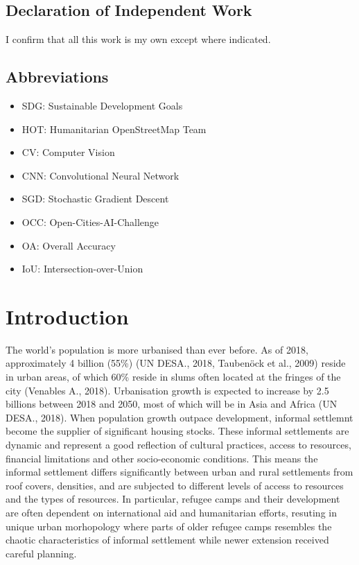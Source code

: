 \documentclass[11pt, a4paper, twoside]{report}
\begin{document}
\newpage
\section{Declaration of Independent Work}

I confirm that all this work is my own except where indicated.
\newpage


\tableofcontents

\newpage

\listoffigures

\newpage

\listoftables
\clearpage

\newpage

\section{Abbreviations}

\begin{itemize}
  \item SDG: Sustainable Development Goals
  \item HOT: Humanitarian OpenStreetMap Team
  \item CV: Computer Vision
  \item CNN: Convolutional Neural Network
  \item SGD: Stochastic Gradient Descent
  \item OCC: Open-Cities-AI-Challenge
  \item OA: Overall Accuracy
  \item IoU: Intersection-over-Union
\end{itemize}

\newpage


\chapter{Introduction}\label{Intro}

The world’s population is more urbanised than ever before. As of 2018, approximately 4 billion (55\%) (UN DESA., 2018, Taubenöck et al., 2009) reside in urban areas, of which 60\% reside in slums often located at the fringes of the city (Venables A., 2018). Urbanisation growth is expected to increase by 2.5 billions between 2018 and 2050, most of which will be in Asia and Africa (UN DESA., 2018). When population growth outpace development, informal settlemnt become the supplier of significant housing stocks. These informal settlements are dynamic and represent a good reflection of cultural practices, access to resources, financial limitations and other socio-economic conditions. This means the informal settlement differs significantly between urban and rural settlements from roof covers, densities, and are subjected to different levels of access to resources and the types of resources. In particular, refugee camps and their development are often dependent on international aid and humanitarian efforts, resuting in unique urban morhopology where parts of older refugee camps resembles the chaotic characteristics of informal settlement while newer extension received careful planning.\\\par
\end{document}
